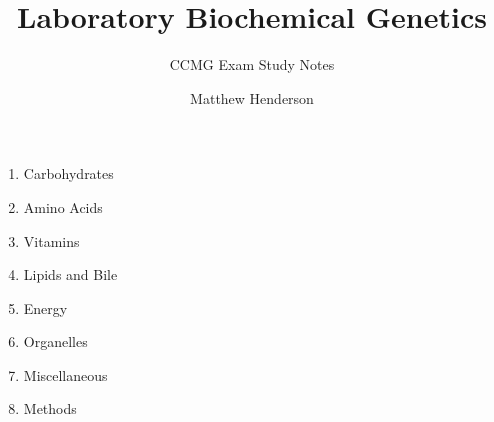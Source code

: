 \documentclass{scrartcl}
\title{Laboratory Biochemical Genetics}
\author{Matthew Henderson}
\subtitle{CCMG Exam Study Notes}
\begin{document}
\maketitle

\vspace*{100}
\begin{center}
  \begin{enumerate}\bfseries\Large
  \item Carbohydrates
  \item Amino Acids
  \item Vitamins
  \item Lipids and Bile
  \item Energy
  \item Organelles
  \item Miscellaneous
  \item Methods
  \end{enumerate}
\end{center}
\end{document}
